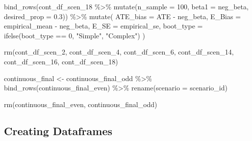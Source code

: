 \documentclass[
]{article}
\newenvironment{Shaded}{\begin{snugshade}}{\end{snugshade}}
\newcommand{\AttributeTok}[1]{\textcolor[rgb]{0.77,0.63,0.00}{#1}}
\newcommand{\DecValTok}[1]{\textcolor[rgb]{0.00,0.00,0.81}{#1}}
\newcommand{\FloatTok}[1]{\textcolor[rgb]{0.00,0.00,0.81}{#1}}
\newcommand{\FunctionTok}[1]{\textcolor[rgb]{0.00,0.00,0.00}{#1}}
\newcommand{\NormalTok}[1]{#1}
\newcommand{\OtherTok}[1]{\textcolor[rgb]{0.56,0.35,0.01}{#1}}
\newcommand{\SpecialCharTok}[1]{\textcolor[rgb]{0.00,0.00,0.00}{#1}}
\newcommand{\StringTok}[1]{\textcolor[rgb]{0.31,0.60,0.02}{#1}}
\begin{document}
\begin{Shaded}
\begin{Highlighting}[]
  \FunctionTok{bind\_rows}\NormalTok{(cont\_df\_scen\_18 }\SpecialCharTok{\%\textgreater{}\%} \FunctionTok{mutate}\NormalTok{(}\AttributeTok{n\_sample =} \DecValTok{100}\NormalTok{, }\AttributeTok{beta1 =}\NormalTok{ neg\_beta, }\AttributeTok{desired\_prop =} \FloatTok{0.3}\NormalTok{)) }\SpecialCharTok{\%\textgreater{}\%} 
  \FunctionTok{mutate}\NormalTok{(}
    \AttributeTok{ATE\_bias =}\NormalTok{ ATE }\SpecialCharTok{{-}}\NormalTok{ neg\_beta,}
    \AttributeTok{E\_Bias =}\NormalTok{ empirical\_mean }\SpecialCharTok{{-}}\NormalTok{ neg\_beta,}
    \AttributeTok{E\_SE =}\NormalTok{ empirical\_se,}
    \AttributeTok{boot\_type =} \FunctionTok{ifelse}\NormalTok{(boot\_type }\SpecialCharTok{==} \DecValTok{0}\NormalTok{, }\StringTok{"Simple"}\NormalTok{, }\StringTok{"Complex"}\NormalTok{)}
\NormalTok{  ) }

\FunctionTok{rm}\NormalTok{(cont\_df\_scen\_2, cont\_df\_scen\_4, cont\_df\_scen\_6, cont\_df\_scen\_14, cont\_df\_scen\_16, cont\_df\_scen\_18)}
\end{Highlighting}
\end{Shaded}

\begin{Shaded}
\begin{Highlighting}[]
\NormalTok{continuous\_final }\OtherTok{\textless{}{-}}
\NormalTok{  continuous\_final\_odd }\SpecialCharTok{\%\textgreater{}\%}
  \FunctionTok{bind\_rows}\NormalTok{(continuous\_final\_even) }\SpecialCharTok{\%\textgreater{}\%} 
  \FunctionTok{rename}\NormalTok{(}\AttributeTok{scenario =}\NormalTok{ scenario\_id)}

\FunctionTok{rm}\NormalTok{(continuous\_final\_even, continuous\_final\_odd)}
\end{Highlighting}
\end{Shaded}

\hypertarget{creating-dataframes}{%
\subsection{Creating Dataframes}\label{creating-dataframes}}
\end{document}
